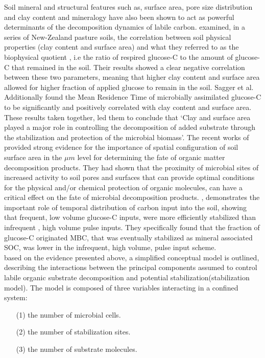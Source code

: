 	Soil mineral and structural features such as, surface area, pore size distribution and clay content and mineralogy have also been shown to act as powerful determinants of the decomposition dynamics of labile carbon. \citet{saggar1999} examined, in a series of New-Zealand pasture soils, the correlation between soil physical properties (clay content and surface area) and what they referred to as the biophysical quotient , i.e the ratio of respired glucose-C to the amount of glucose-C that remained in the soil. Their results showed a clear negative correlation between these two parameters, meaning that higher clay content and surface area allowed for higher fraction of applied glucose to remain in the soil. Sagger et al. Additionally found the Mean Residence Time of microbially assimilated glucose-C to be significantly and positively correlated with clay content and surface area. These results taken together, led them to conclude that ‘Clay and surface area played a major role in controlling the decomposition of added substrate through the stabilization and protection of the microbial biomass’\citep[p. 12]{saggar1999}. The recent works of \citet{kravchenko2019, kravchenko2015} provided strong evidence for the importance of spatial configuration of soil surface area in the $ \mu m $ level for determining the fate of organic matter decomposition products. They had shown that the proximity of microbial sites of increased activity to soil pores and surfaces that can provide optimal conditions for the physical and/or chemical protection of organic molecules, can have a critical effect on the fate of microbial decomposition products.
	\citet{sokol2019c}, demonstrates the important role of temporal distribution of carbon input into the soil, showing that frequent, low volume glucose-C inputs, were more efficiently stabilized than infrequent , high volume pulse inputs. They specifically found that the fraction of glucose-C originated MBC, that was eventually stabilized as mineral associated SOC, was lower in the infrequent, high volume, pulse input scheme.\\
	based on the evidence presented above,  a simplified conceptual model is outlined, describing the interactions between the principal components assumed to control labile organic substrate decomposition and potential stabilization(stabilization model). The model is composed of three variables interacting in a confined system:
	\begin{enumerate}
		\item [(1)] the number of microbial cells.
		\item [(2)] the number of stabilization sites.
		\item [(3)]the number of substrate molecules.
	\end{enumerate}

